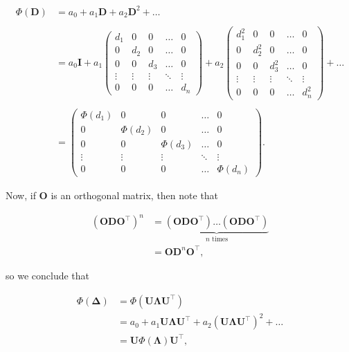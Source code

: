 \begin{align*} %
    \Phi(\mathbf D) &= a_0 + a_1 \mathbf D + a_2 \mathbf D^2 + \dots\\
    \\
    &= a_0 \mathbf I + a_1 
    \begin{pmatrix}
        d_1 & 0 & 0 & \ldots & 0 \\
        0 & d_2 & 0 & \ldots & 0 \\
        0 & 0 & d_3 & \ldots & 0 \\
        \vdots & \vdots & \vdots & \ddots & \vdots \\
        0 & 0 & 0 & \ldots & d_n
    \end{pmatrix}
    + a_2
    \begin{pmatrix}
        d_1^2 & 0 & 0 & \ldots & 0 \\
        0 & d_2^2 & 0 & \ldots & 0 \\
        0 & 0 & d_3^2 & \ldots & 0 \\
        \vdots & \vdots & \vdots & \ddots & \vdots \\
        0 & 0 & 0 & \ldots & d_n^2
    \end{pmatrix}
    + \dots \\
    \\
    &= 
    \begin{pmatrix}
        \Phi(d_1) & 0 & 0 & \ldots & 0 \\
        0 & \Phi(d_2) & 0 & \ldots & 0 \\
        0 & 0 & \Phi(d_3) & \ldots & 0 \\
        \vdots & \vdots & \vdots & \ddots & \vdots \\
        0 & 0 & 0 & \ldots & \Phi(d_n)
    \end{pmatrix}.
\end{align*}

Now, if $\mathbf O$ is an orthogonal matrix, then note that

\begin{align*}
    (\mathbf{ODO}^\intercal)^n &= \underbrace{(\mathbf{ODO}^\intercal)\dots(\mathbf{ODO}^\intercal)}_{n \text{ times}}\\
    &= \mathbf{O}\mathbf D^n \mathbf{O}^\intercal,
\end{align*}

so we conclude that

\begin{align*}
    \Phi(\mathbf \Delta) &= \Phi(\mathbf{U \Lambda U}^\intercal) \\
    &= a_0 + a_1 \mathbf{U \Lambda U}^\intercal + a_2 (\mathbf{U \Lambda U}^\intercal)^2 + \dots\\
    &= \mathbf U \Phi(\mathbf \Lambda) \mathbf{U}^\intercal,
\end{align*}

